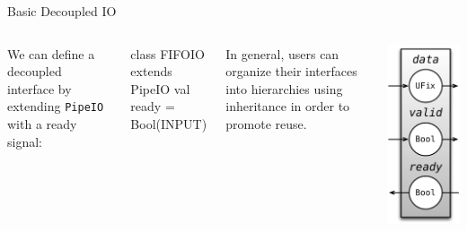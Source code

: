 \documentclass[xcolor=pdflatex,dvipsnames,table]{beamer}
\begin{document}
\begin{frame}[fragile]{Basic Decoupled IO}

\begin{columns}

We can define a decoupled interface by extending \verb+PipeIO+ with a ready signal:

\begin{scala}
class FIFOIO extends PipeIO { 
  val ready = Bool(INPUT)
}
\end{scala}

\noindent
In general, users can organize their interfaces into hierarchies using inheritance in order to promote reuse.  


\begin{center}
\includegraphics[height=0.9\textheight]{figs/FIFOIO.pdf} 
\end{center}

\end{columns}

\end{frame}
\end{document}

